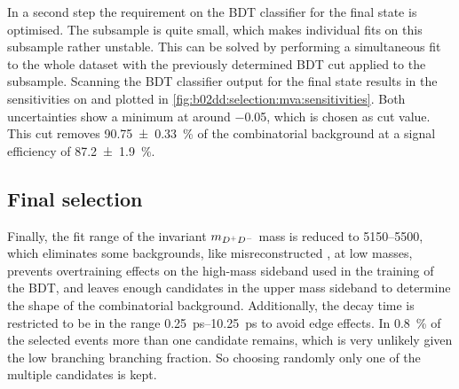 In a second step the requirement on the BDT classifier for the \KKpiKpipi
final state is optimised. The \KKpiKpipi subsample is quite small, which makes
individual fits on this subsample rather unstable. This can be solved by
performing a simultaneous fit to the whole dataset with the previously
determined BDT cut applied to the \KpipiKpipi subsample. Scanning the BDT
classifier output for the \KKpiKpipi final state results in the sensitivities
on \SDD and \CDD plotted in \cref{fig:b02dd:selection:mva:sensitivities}. Both
uncertainties show a minimum at around \num{-0.05}, which is chosen as cut
value. This cut removes \SI{90.75\pm0.33}{\percent} of the combinatorial
background at a signal efficiency of \SI{87.2\pm1.9}{\percent}.

\subsection{Final selection}
\label{sec:b02dd:selection:final_selection}

Finally, the fit range of the invariant $m_{{{D}^+}{{D}^-}}$ mass is reduced to
\SIrange{5150}{5500}{\MeVcc}, which eliminates some backgrounds, like
misreconstructed \mbox{\BdToDstD}, at low masses, prevents overtraining
effects on the high-mass sideband used in the training of the BDT, and leaves
enough candidates in the upper mass sideband to determine the shape of the
combinatorial background. Additionally, the decay time is restricted to be in
the range \SIrange{0.25}{10.25}{\ps} to avoid edge effects. In
\SI{0.8}{\percent} of the selected events more than one candidate remains,
which is very unlikely given the low branching branching fraction. So choosing
randomly only one of the multiple candidates is kept.
